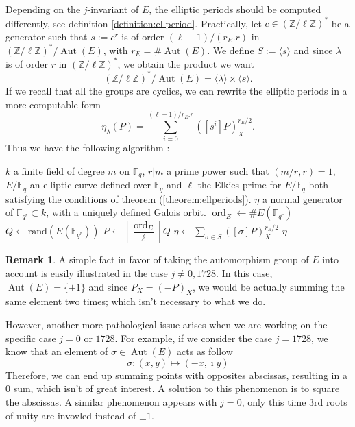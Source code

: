 \documentclass[12pt]{article}
\theoremstyle{plain}
\theoremstyle{definition}
\newtheorem*{remark}{Remark}
\DeclareMathOperator{\order}{ord} %
\DeclareMathOperator{\Aut}{Aut}
\def\Z{\ensuremath{\mathbb{Z}}}
\def\F{\ensuremath{\mathbb{F}}}
\newcounter{algorithm}
\begin{document}
Depending on the $j$-invariant of $E$, the elliptic periods should be computed 
differently, see definition \ref{definition:ellperiod}. Practically, let 
$c\in(\Z/\ell\Z)^{\ast}$ be a generator such that $s:=c^r$ is of order 
$(\ell-1)/(r_E.r)$ in $(\Z/\ell\Z)^{\ast}/\Aut(E)$, with 
$r_E=\#\Aut(E)$. We define $S:=\langle{s}\rangle$ and since $\lambda$ 
is of order $r$ in $(\Z/\ell\Z)^{\ast}$, we obtain the product we want
\[
(\Z/\ell\Z)^{\ast}/\Aut(E)=\langle{\lambda}\rangle\times\langle{s}\rangle.
\]
If we recall that all the groups are cyclics, we can rewrite the elliptic 
periods in a more computable form
\begin{equation}
\eta_\lambda(P)=\sum_{i=0}^{(\ell-1)/r_E.r}
{\left([s^i]P\right)_X^{r_E/2}}.
\end{equation}
Thus we have the following algorithm : 

\begin{algorithm}
\label{algorithm:compell}
    \begin{algorithmic}[1]
    \REQUIRE $k$ a finite field of degree $m$ on $\F_q$, $r|m$ a prime power
such that $(m/r,r) = 1$, $E/\F_q$ an elliptic curve defined over $\F_q$ and 
$\ell$ the Elkies prime for $E/\F_q$ both satisfying the conditions of theorem
(\ref{theorem:ellperiods}).
    \ENSURE $\eta$ a normal generator of $\F_{q^r}\subset k$, with a uniquely
defined Galois orbit.
    \STATE $\order_E\leftarrow\#E(\F_{q^r})$
    \REPEAT
        \STATE $Q\leftarrow\text{rand}(E(\F_{q^r}))$
        \STATE $P\leftarrow[\dfrac{\order_E}{\ell}]Q$
    \STATE $\eta\leftarrow\sum_{\sigma\in S}{\left([\sigma]P\right)_X^{r_E/2}}$
    \RETURN $\eta$
    \end{algorithmic}
\end{algorithm}

\begin{remark}
A simple fact in favor of taking the automorphism group of $E$ into account is
easily illustrated in the case $j\neq0,1728$. In this case, $\Aut(E) =
\lbrace{\pm1}\rbrace$ and since $P_X = (-P)_X$, we would be actually summing the
same element two times; which isn't necessary to what we do.

However, another more pathological issue arises when we are working on the
specific case $j = 0$ or $1728$. For example, if we consider the case $j =
1728$, we know that an element of $\sigma\in\Aut(E)$ acts as follow
\[
\sigma:(x,y)\mapsto(-x,\imath y)
\]
Therefore, we can end up summing points with opposites abscissas, resulting in a
$0$ sum, which isn't of great interest. A solution to this phenomenon is to
square the abscissas. A similar phenomenon appears with $j = 0$, only this time
$3$rd roots of unity are invovled instead of $\pm1$.
\end{remark}
\end{document}
